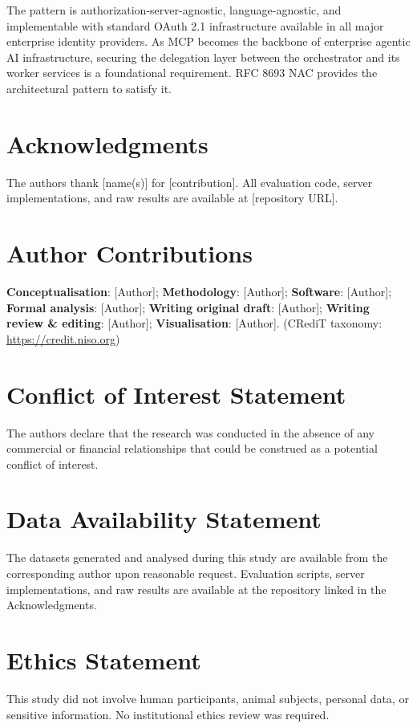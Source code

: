 \documentclass[journal]{IEEEtran}
\begin{document}
The pattern is authorization-server-agnostic, language-agnostic, and
implementable with standard OAuth 2.1 infrastructure available in all major
enterprise identity providers. As MCP becomes the backbone of enterprise agentic
AI infrastructure, securing the delegation layer between the orchestrator and its
worker services is a foundational requirement. RFC 8693 NAC provides the
architectural pattern to satisfy it.

\FloatBarrier  %

\section*{Acknowledgments}
The authors thank [name(s)] for [contribution]. All evaluation code, server
implementations, and raw results are available at [repository URL].

\section*{Author Contributions}
\textbf{Conceptualisation}: [Author]; \textbf{Methodology}: [Author];
\textbf{Software}: [Author]; \textbf{Formal analysis}: [Author];
\textbf{Writing original draft}: [Author];
\textbf{Writing review \& editing}: [Author];
\textbf{Visualisation}: [Author].
(CRediT taxonomy: \url{https://credit.niso.org})

\section*{Conflict of Interest Statement}
The authors declare that the research was conducted in the absence of any
commercial or financial relationships that could be construed as a potential
conflict of interest.

\section*{Data Availability Statement}
The datasets generated and analysed during this study are available from the
corresponding author upon reasonable request. Evaluation scripts, server
implementations, and raw results are available at the repository linked in the
Acknowledgments.

\section*{Ethics Statement}
This study did not involve human participants, animal subjects, personal data,
or sensitive information. No institutional ethics review was required.
\end{document}

